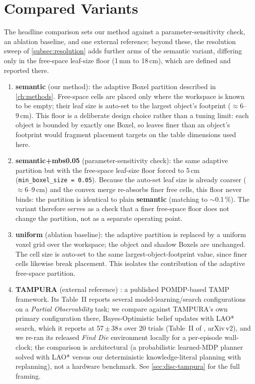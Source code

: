 \section{Compared Variants}
\label{sec:baselines}

The headline comparison sets our method against a parameter-sensitivity check, an ablation baseline, and one external reference; beyond these, the resolution sweep of \cref{subsec:resolution} adds further arms of the semantic variant, differing only in the free-space leaf-size floor (1\,mm to 18\,cm), which are defined and reported there.
\begin{enumerate}
    \item \textbf{semantic} (our method): the adaptive Boxel partition described in \cref{ch:methods}. Free-space cells are placed only where the workspace is known to be empty; their leaf size is auto-set to the largest object's footprint ($\approx$6--9\,cm). This floor is a deliberate design choice rather than a tuning limit: each object is bounded by exactly one Boxel, so leaves finer than an object's footprint would fragment placement targets on the table dimensions used here.
    \item \textbf{semantic+mbs0.05} (parameter-sensitivity check): the same adaptive partition but with the free-space leaf-size floor forced to 5\,cm (\texttt{min\_boxel\_size = 0.05}). Because the auto-set leaf size is already coarser ($\approx$6--9\,cm) and the convex merge re-absorbs finer free cells, this floor never binds: the partition is identical to plain \textbf{semantic} (matching to $\sim$0.1\,\%). The variant therefore serves as a check that a finer free-space floor does not change the partition, not as a separate operating point.
    \item \textbf{uniform} (ablation baseline): the adaptive partition is replaced by a uniform voxel grid over the workspace; the object and shadow Boxels are unchanged. The cell size is auto-set to the same largest-object-footprint value, since finer cells likewise break placement. This isolates the contribution of the adaptive free-space partition.
    \item \textbf{TAMPURA} (external reference) \cite{curtis2024partially}: a published POMDP-based TAMP framework. Its Table~II reports several model-learning/search configurations on a \textit{Partial Observability} task; we compare against TAMPURA's own primary configuration there, Bayes-Optimistic belief updates with LAO* search, which it reports at 57\,$\pm$\,38\,s over 20 trials (Table~II of \cite{curtis2024partially}, arXiv\,v2), and we re-ran its released \emph{Find Die} environment locally for a per-episode wall-clock; the comparison is architectural (a probabilistic learned-MDP planner solved with LAO* versus our deterministic knowledge-literal planning with replanning), not a hardware benchmark. See \cref{sec:disc-tampura} for the full framing.
\end{enumerate}

